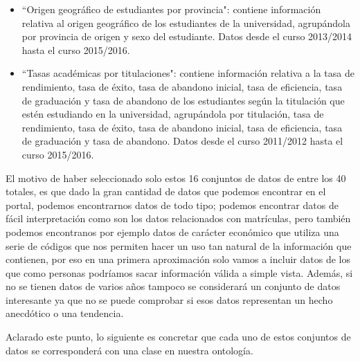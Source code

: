 \begin{itemize}
	\item ``Origen geográfico de estudiantes por provincia": contiene información relativa al origen geográfico de los estudiantes de la universidad, agrupándola por provincia de origen y sexo del estudiante. Datos desde el curso 2013/2014 hasta el curso 2015/2016.
	\item ``Tasas académicas por titulaciones": contiene información relativa a la tasa de rendimiento, tasa de éxito, tasa de abandono inicial, tasa de eficiencia, tasa de graduación y tasa de abandono de los estudiantes según la titulación que estén estudiando en la universidad, agrupándola por titulación, tasa de rendimiento, tasa de éxito, tasa de abandono inicial, tasa de eficiencia, tasa de graduación y tasa de abandono. Datos desde el curso 2011/2012 hasta el curso 2015/2016.
\end{itemize}

El motivo de haber seleccionado solo estos 16 conjuntos de datos de entre los 40 totales, es que dado la gran cantidad de datos que podemos encontrar en el portal, podemos encontrarnos datos de todo tipo; podemos encontrar datos de fácil interpretación como son los datos relacionados con matrículas, pero también podemos encontranos por ejemplo datos de carácter económico que utiliza una serie de códigos que nos permiten hacer un uso tan natural de la información que contienen, por eso en una primera aproximación solo vamos a incluir datos de los que como personas podríamos sacar información válida a simple vista. Además, si no se tienen datos de varios años tampoco se considerará un conjunto de datos interesante ya que no se puede comprobar si esos datos representan un hecho anecdótico o una tendencia.

\bigskip

Aclarado este punto, lo siguiente es concretar que cada uno de estos conjuntos de datos se corresponderá con una clase en nuestra ontología.

